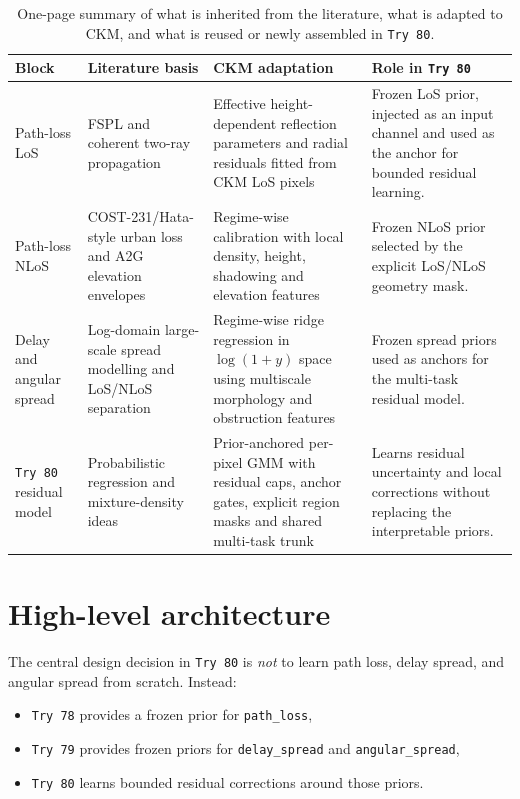 \documentclass[11pt,a4paper]{article}
\begin{document}
\begin{table}[H]
\centering
\small
\begin{tabularx}{\textwidth}{p{2.2cm} p{3.1cm} p{4.0cm} X}
\toprule
\textbf{Block} & \textbf{Literature basis} & \textbf{CKM adaptation} &
\textbf{Role in \texttt{Try 80}} \\
\midrule
Path-loss LoS & FSPL and coherent two-ray propagation &
Effective height-dependent reflection parameters and radial residuals fitted
from CKM LoS pixels &
Frozen LoS prior, injected as an input channel and used as the anchor for
bounded residual learning. \\
\addlinespace
Path-loss NLoS & COST-231/Hata-style urban loss and A2G elevation envelopes &
Regime-wise calibration with local density, height, shadowing and elevation
features &
Frozen NLoS prior selected by the explicit LoS/NLoS geometry mask. \\
\addlinespace
Delay and angular spread & Log-domain large-scale spread modelling and
LoS/NLoS separation &
Regime-wise ridge regression in \(\log(1+y)\) space using multiscale
morphology and obstruction features &
Frozen spread priors used as anchors for the multi-task residual model. \\
\addlinespace
\texttt{Try 80} residual model & Probabilistic regression and mixture-density
ideas &
Prior-anchored per-pixel GMM with residual caps, anchor gates, explicit
region masks and shared multi-task trunk &
Learns residual uncertainty and local corrections without replacing the
interpretable priors. \\
\bottomrule
\end{tabularx}
\caption{One-page summary of what is inherited from the literature, what is
adapted to CKM, and what is reused or newly assembled in \texttt{Try 80}.}
\label{tab:executive_summary}
\end{table}

\section{High-level architecture}

The central design decision in \texttt{Try 80} is \emph{not} to learn path
loss, delay spread, and angular spread from scratch. Instead:

\begin{itemize}
\item \texttt{Try 78} provides a frozen prior for \texttt{path\_loss},
\item \texttt{Try 79} provides frozen priors for \texttt{delay\_spread} and
      \texttt{angular\_spread},
\item \texttt{Try 80} learns bounded residual corrections around those priors.
\end{itemize}
\end{document}
